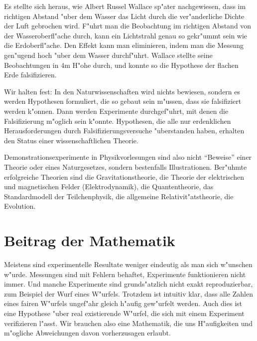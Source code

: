 Es stellte sich heraus, wie Albert Russel Wallace sp"ater nachgewiesen,
dass im richtigen Abstand "uber dem Wasser das Licht durch die
ver"anderliche Dichte der Luft gebrochen wird.
F"uhrt man die Beobachtung im richtigen Abstand von der Wasseroberfl"ache
durch, kann ein Lichtstrahl genau so gekr"ummt sein wie die Erdoberfl"ache.
Den Effekt kann man eliminieren, indem man die Messung gen"ugend hoch
"uber dem Wasser durchf"uhrt. 
Wallace stellte seine Beobachtungen in 4m H"ohe durch, und konnte
so die Hypothese der flachen Erde falsifizieren.

Wir halten fest: In den Naturwissenschaften wird nichts bewiesen,
sondern es werden Hypothesen formuliert, die so gebaut sein
m"ussen, dass sie falsifiziert werden k"onnen.
Dann werden Experimente durchgef"uhrt, mit denen die Falsifizierung
m"oglich sein k"onnte.
Hypothesen, die alle nur erdenklichen Herausforderungen durch
Falsifizierungsversuche "uberstanden haben, erhalten den Status
einer wissenschaftlichen Theorie.

Demonstrationsexperimente in Physikvorlesungen sind also nicht
``Beweise'' einer Theorie oder eines Naturgesetzes, sondern bestenfalls
Illustrationen.
Ber"uhmte erfolgreiche Theorien sind die Gravitationstheorie, die
Theorie der elektrischen und magnetischen Felder (Elektrodynamik),
die Quantentheorie, das Standardmodell der Teilchenphysik, die
allgemeine Relativit"atstheorie, die Evolution.

\section*{Beitrag der Mathematik}
Meistens sind experimentelle Resultate weniger eindeutig als man sich
w"unschen w"urde.
Messungen sind mit Fehlern behaftet, Experimente funktionieren nicht
immer.
Und manche Experimente sind grunds"atzlich nicht exakt reproduzierbar,
zum Beispiel der Wurf eines W"urfels.
Trotzdem ist intuitiv klar, dass alle Zahlen eines fairen W"urfels
ungef"ahr gleich h"aufig gew"urfelt werden.
Auch dies ist eine Hypothese "uber real existierende W"urfel, die
sich mit einem Experiment verifizieren l"asst.
Wir brauchen also eine Mathematik, die uns H"aufigkeiten und m"ogliche
Abweichungen davon vorherzusagen erlaubt.





